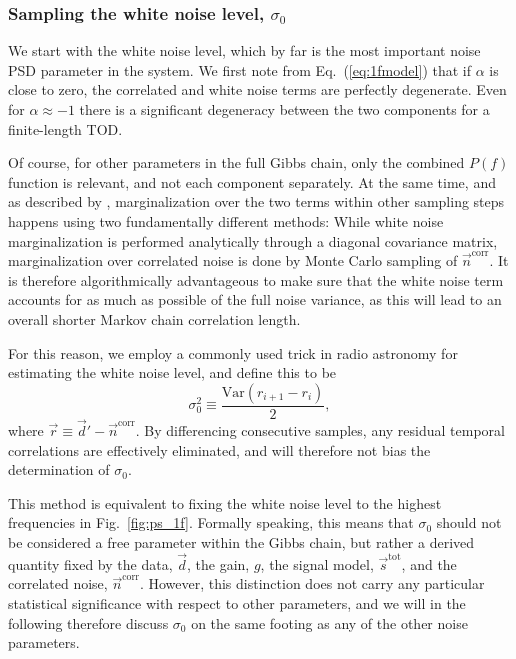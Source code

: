 \documentclass[twocolumn]{aa}
\newcommand{\n}[0]{\vec{n}}
\begin{document}
\subsubsection{Sampling the white noise level, $\sigma_0$}

We start with the white noise level, which by far is the most
important noise PSD parameter in the system. We first note from
Eq.~(\ref{eq:1fmodel}) that if $\alpha$ is close to zero, the
correlated and white noise terms are perfectly degenerate. Even for
$\alpha\approx-1$ there is a significant degeneracy between the two
components for a finite-length TOD.

Of course, for other parameters in the full Gibbs chain, only the
combined $P(f)$ function is relevant, and not each component
separately. At the same time, and as described by \citet{bp01},
marginalization over the two terms within other sampling steps happens
using two fundamentally different methods: While white noise
marginalization is performed analytically through a diagonal
covariance matrix, marginalization over correlated noise is done by
Monte Carlo sampling of $\n^{\mathrm{corr}}$. It is therefore
algorithmically advantageous to make sure that the white noise term
accounts for as much as possible of the full noise variance, as this
will lead to an overall shorter Markov chain correlation length.

For this reason, we employ a commonly used trick in radio astronomy
for estimating the white noise level, and define this to be
\begin{equation}
  \sigma_0^2 \equiv \frac{\mathrm{Var}(r_{i+1} - r_i)}{2},
  \label{eq:sigma0}
\end{equation}
where $\vec{r} \equiv \vec{d}' - \vec{n}^\mathrm{corr}$. By
differencing consecutive samples, any residual temporal correlations
are effectively eliminated, and will therefore not bias the
determination of $\sigma_0$. 

This method is equivalent to fixing the white noise level to the
highest frequencies in Fig.~\ref{fig:ps_1f}. Formally speaking, this
means that $\sigma_0$ should not be considered a free parameter within
the Gibbs chain, but rather a derived quantity fixed by the data,
$\vec{d}$, the gain, $g$, the signal model, $\vec{s}^\mathrm{tot}$,
and the correlated noise, $\vec{n}^\mathrm{corr}$. However, this
distinction does not carry any particular statistical significance
with respect to other parameters, and we will in the following
therefore discuss $\sigma_0$ on the same footing as any of the other
noise parameters.
\end{document}
